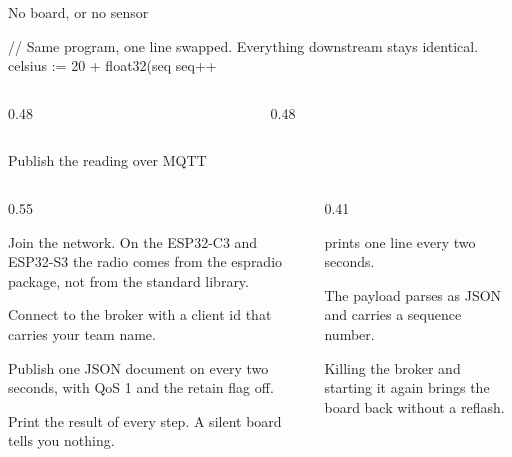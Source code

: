 \documentclass[10pt,aspectratio=169,t]{beamer}
\begin{document}
\begin{frame}[embedded,fragile,eyebrow=Task I]{No board, or no sensor}
  \vskip 1mm
\begin{golang}
// Same program, one line swapped. Everything downstream stays identical.
celsius := 20 + float32(seq%
seq++
\end{golang}
  \vskip 2mm
  \begin{columns}[T]
    \begin{column}{0.48\textwidth}
    \end{column}
    \begin{column}{0.48\textwidth}
    \end{column}
  \end{columns}
  \vskip 3mm
\end{frame}

\begin{frame}[embedded,eyebrow=Task II]{Publish the reading over MQTT}
  \begin{columns}[T]
    \begin{column}{0.55\textwidth}
      \begin{steps}
        \item Join the network. On the ESP32-C3 and ESP32-S3 the radio comes from the espradio package, not from the standard library.
        \item Connect to the broker with a client id that carries your team name.
        \item Publish one JSON document on  every two seconds, with QoS 1 and the retain flag off.
        \item Print the result of every step. A silent board tells you nothing.
      \end{steps}
    \end{column}
    \begin{column}{0.41\textwidth}
      \begin{checklist}
        \item {} prints one line every two seconds.
        \item The payload parses as JSON and carries a sequence number.
        \item Killing the broker and starting it again brings the board back without a reflash.
      \end{checklist}
    \end{column}
  \end{columns}
\end{frame}
\end{document}
